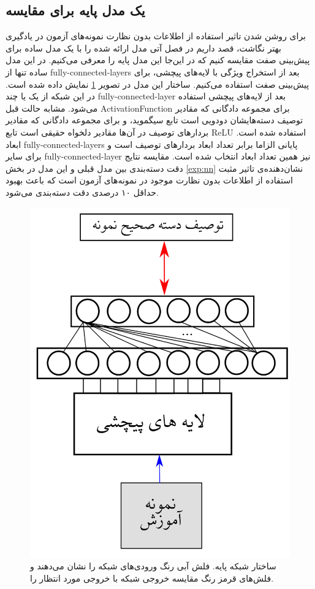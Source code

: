 \subsection{یک مدل پایه برای مقایسه}\label{nn_basic}
برای روشن شدن تاثیر استفاده از اطلاعات بدون نظارت نمونه‌های آزمون در یادگیری بهتر نگاشت، قصد داریم در فصل آتی مدل ارائه شده را با یک مدل ساده برای پیش‌بینی صفت مقایسه کنیم که در این‌جا این مدل پایه را معرفی می‌کنیم. در این مدل ساده تنها  از
\glspl{fully-connected-layer}
بعد از استخراج ویژگی با لایه‌های پیچشی، برای پیش‌بینی صفت استفاده می‌کنیم. ساختار این مدل در تصویر \ref{fig:nn_basic} نمایش داده شده است. در این شبکه از یک یا چند
\gls{fully-connected-layer}
بعد از لایه‌های پیچشی استفاده می‌شود. مشابه حالت قبل \gls{ActivationFunction} برای مجموعه دادگانی که مقادیر توصیف دسته‌هایشان دودویی است تابع سیگموید، و برای مجموعه دادگانی که مقادیر بردارهای توصیف در آن‌ها مقادیر دلخواه حقیقی است تابع \gls{ReLU} استفاده شده است.
ابعاد  \glspl{fully-connected-layer} پایانی الزاما برابر تعداد ابعاد بردارهای توصیف است و برای سایر   \gls{fully-connected-layer} نیز همین تعداد ابعاد انتخاب شده است.
مقایسه نتایج دقت دسته‌بندی بین مدل قبلی و این مدل در بخش \ref{exp:nn} نشان‌دهنده‌ی تاثیر مثبت استفاده از اطلاعات بدون نظارت موجود در نمونه‌های آزمون است که باعث بهبود حداقل ۱۰ درصدی دقت دسته‌بندی  می‌شود.
\begin{figure}[!ht]
\centering
\includegraphics[width=0.4\linewidth]{images/basic_net}
\caption[شبکه‌ی پایه برای پیش‌بینی صفت]{
ساختار شبکه پایه. فلش آبی رنگ ورودی‌های شبکه را نشان می‌دهند و فلش‌های قرمز رنگ مقایسه خروجی شبکه با خروجی مورد انتظار را.}
\label{fig:nn_basic}
\end{figure}


